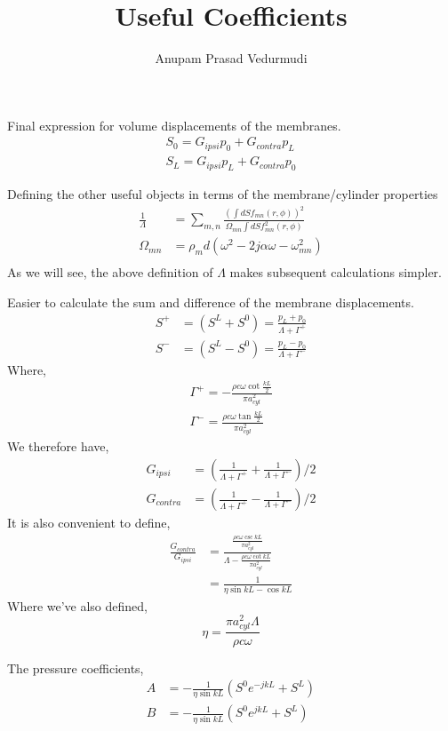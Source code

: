 \documentclass[a4paper,10pt]{article}
\title{Useful Coefficients}
\author{Anupam Prasad Vedurmudi}
\date{}
\begin{document}
\maketitle
Final expression for volume displacements of the membranes.
\begin{align}
 S_0=G_{ipsi}p_0+G_{contra}p_L\\
 S_L=G_{ipsi}p_L+G_{contra}p_0
\end{align}

Defining the other useful objects in terms of the membrane/cylinder properties
\begin{align}
 \frac{1}{\Lambda}&=\sum_{m,n}\frac{\left(\int dS f_{mn}(r,\phi)\right)^2}{\Omega_{mn}\int dS f^2_{mn}(r,\phi)}\\
 \Omega_{mn}&=\rho_m d \left(\omega^2-2j\alpha\omega-\omega^2_{mn}\right)\\
\end{align}
As we will see, the above definition of $\Lambda$ makes subsequent calculations simpler.

Easier to calculate the sum and difference of the membrane displacements.
\begin{align}
 S^+&=(S^L+S^0)=\frac{p_L+p_0}{\Lambda+\Gamma^+}\\
 S^-&=(S^L-S^0)=\frac{p_L-p_0}{\Lambda+\Gamma^-}
\end{align}
Where,
\begin{align}
 \Gamma^+=-\frac{\rho c\omega \cot \frac{kL}{2}}{\pi a^2_{cyl}}\\
 \Gamma^-=\frac{\rho c\omega \tan \frac{kL}{2}}{\pi a^2_{cyl}}
\end{align}
We therefore have,
\begin{align}
 G_{ipsi}&=\left(\frac{1}{\Lambda+\Gamma^+}+\frac{1}{\Lambda+\Gamma^-}\right)/2\\
 G_{contra}&=\left(\frac{1}{\Lambda+\Gamma^+}-\frac{1}{\Lambda+\Gamma^-}\right)/2
\end{align}
It is also convenient to define,
\begin{align}
 \frac{G_{contra}}{G_{ipsi}}&=\frac{\frac{\rho c\omega \csc kL}{\pi a^2_{cyl}}}{\Lambda-\frac{\rho c\omega \cot kL}{\pi a^2_{cyl}}}\\
			     &=\frac{1}{\eta\sin kL- \cos kL}
\end{align}
Where we've also defined,
\begin{equation}
 \eta=\frac{\pi a^2_{cyl}\Lambda}{\rho c\omega}
\end{equation}

The pressure coefficients,
\begin{align}
 A&=-\frac{1}{\eta \sin kL}\left(S^0e^{-jkL}+S^L\right)\\
 B&=-\frac{1}{\eta \sin kL}\left(S^0e^{jkL}+S^L\right)
\end{align}
\end{document}
